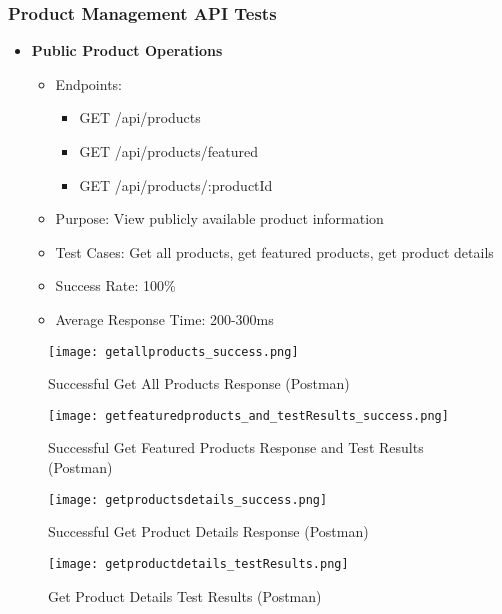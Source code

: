 \subsubsection{Product Management API Tests}
\begin{itemize}
    \item \textbf{Public Product Operations}
    \begin{itemize}
        \item Endpoints:
        \begin{itemize}
            \item GET /api/products
            \item GET /api/products/featured
            \item GET /api/products/:productId
        \end{itemize}
        \item Purpose: View publicly available product information
        \item Test Cases: Get all products, get featured products, get product details
        \item Success Rate: 100\%
        \item Average Response Time: 200-300ms
    \end{itemize}
\end{itemize}

\begin{figure}[h!]
    \centering
    \texttt{[image: getallproducts\_success.png]}
    \caption{Successful Get All Products Response (Postman)}
    \label{fig:getallproducts_success}
\end{figure}

\begin{figure}[h!]
    \centering
    \texttt{[image: getfeaturedproducts\_and\_testResults\_success.png]}
    \caption{Successful Get Featured Products Response and Test Results (Postman)}
    \label{fig:getfeaturedproducts_success}
\end{figure}

\begin{figure}[h!]
    \centering
    \texttt{[image: getproductsdetails\_success.png]}
    \caption{Successful Get Product Details Response (Postman)}
    \label{fig:getproductsdetails_success}
\end{figure}

\begin{figure}[h!]
    \centering
    \texttt{[image: getproductdetails\_testResults.png]}
    \caption{Get Product Details Test Results (Postman)}
    \label{fig:getproductdetails_testresults}
\end{figure}

